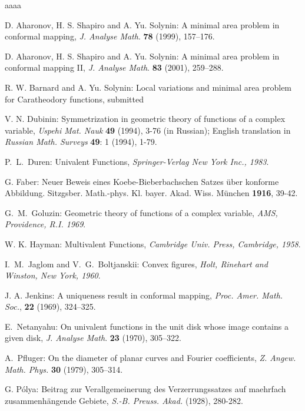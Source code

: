 \begin{thebibliography}{aaaa}


D. Aharonov, H. S. Shapiro and A. Yu. Solynin: A minimal area problem in
conformal mapping, {\it J. Analyse Math}. {\bf 78} (1999), 157--176.

D. Aharonov, H. S. Shapiro and A. Yu. Solynin: A minimal area problem in
conformal mapping II, {\it J. Analyse Math}. {\bf 83} (2001), 259--288.

R. W. Barnard and A. Yu. Solynin: Local variations and minimal area problem for Caratheodory
functions, submitted


V. N. Dubinin: Symmetrization in geometric theory of functions of a
complex variable, \emph{Uspehi Mat. Nauk}
 {\bf 49} (1994), 3-76 (in Russian); English translation in \emph{Russian Math. Surveys} {\bf 49}: 1
(1994), 1-79.

P.~L.~Duren: Univalent Functions, \emph{Springer-Verlag New York Inc., 1983}.

G. Faber: Neuer Beweis eines Koebe-Bieberbachschen Satzes {\" u}ber konforme Abbildung.  
Sitzgsber.  Math.-phys. Kl. bayer. Akad. Wiss. M{\"u}nchen {\bf 1916}, 39-42.

G.~M.~Goluzin: Geometric theory of functions of a complex variable, \emph{AMS, Providence, R.I. 1969}.

W. K. Hayman: Multivalent Functions, \emph{Cambridge Univ. Press, Cambridge, 1958}.


I.~M.~Jaglom and V.~G.~Boltjanskii: Convex figures, \emph{Holt, Rinehart and Winston, New York, 1960}.


J. A. Jenkins: A uniqueness result in conformal mapping, \emph{Proc. Amer. Math. Soc.}, {\bf 22} (1969), 324--325.

E.~Netanyahu: On univalent functions in the unit disk whose image contains a given
disk, {\it J. Analyse Math}. {\bf 23} (1970),  305--322.


A.~Pfluger: On the diameter of planar curves and Fourier coefficients, \emph{Z. Angew. Math. Phys.} {\bf 30} (1979), 305--314.

G. P{\' o}lya: Beitrag zur Verallgemeinerung des Verzerrungssatzes auf maehrfach 
zusammenh{\" a}ngende Gebiete, {\it S.-B. Preuss. Akad.} (1928), 280-282.



\end{thebibliography}
